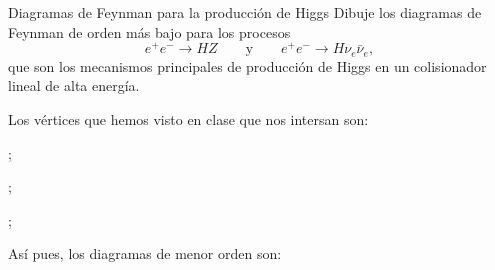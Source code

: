 \begin{Ejercicio}{Diagramas de Feynman para la producción de Higgs}\label{Ej:24}
Dibuje los diagramas de Feynman de orden más bajo para los procesos
\[
e^+ e^- \to HZ 
\qquad \text{y} \qquad
e^+ e^- \to H\nu_e \bar{\nu}_e,
\]
que son los mecanismos principales de producción de Higgs en un colisionador lineal de alta energía.
\end{Ejercicio}

Los vértices que hemos visto en clase que nos intersan son: 

\begin{minipage}{0.33\linewidth}	
\centering
	;
\end{minipage}
\begin{minipage}{0.33\linewidth}	
\centering
	;
\end{minipage}
\begin{minipage}{0.33\linewidth}	
\centering
	;
\end{minipage}

\vspace*{1em}
Así pues, los diagramas de menor orden son: 
\vspace*{1em}

